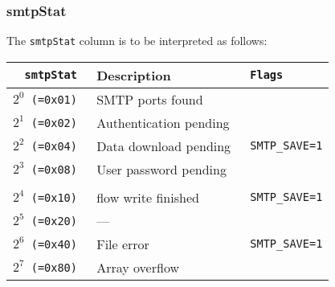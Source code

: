 \documentclass[documentation]{subfiles}
\begin{document}
\subsubsection{smtpStat}\label{smtpStat}
The {\tt smtpStat} column is to be interpreted as follows:
\begin{longtable}{>{\tt}rl>{\tt\small}l}
    \toprule
    {\bf smtpStat} & {\bf Description}      & {\bf Flags}\\
    \midrule\endhead%
    $2^0$ (=0x01)  & SMTP ports found       & \\
    $2^1$ (=0x02)  & Authentication pending & \\
    $2^2$ (=0x04)  & Data download pending  & SMTP\_SAVE=1\\
    $2^3$ (=0x08)  & User password pending  & \\
    \\
    $2^4$ (=0x10)  & flow write finished    & SMTP\_SAVE=1\\
    $2^5$ (=0x20)  & ---                    & \\
    $2^6$ (=0x40)  & File error             & SMTP\_SAVE=1\\
    $2^7$ (=0x80)  & Array overflow         & \\
    \bottomrule
\end{longtable}
\end{document}
